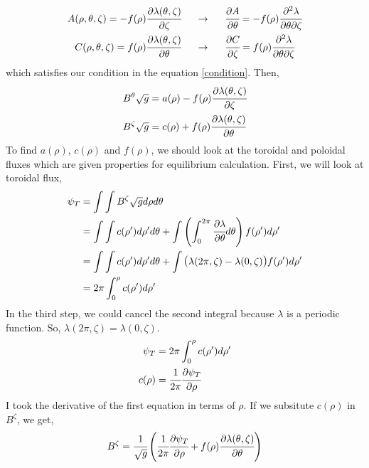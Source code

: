 \begin{align}
    A(\rho,\theta,\zeta) = -f(\rho)\cfrac{\partial\lambda(\theta,\zeta)}{\partial\zeta} \hspace{.5cm}&\rightarrow\hspace{.5cm} \cfrac{\partial A}{\partial\theta} = -f(\rho)\cfrac{\partial^2\lambda}{\partial\theta\partial\zeta} \\
    C(\rho,\theta,\zeta) = f(\rho)\cfrac{\partial\lambda(\theta,\zeta)}{\partial\theta} \hspace{.5cm}&\rightarrow\hspace{.5cm} \cfrac{\partial C}{\partial\zeta} = f(\rho)\cfrac{\partial^2\lambda}{\partial\theta\partial\zeta}    
\end{align}
which satisfies our condition in the equation \ref{condition}. Then,
\begin{align}
    B^\theta\sqrt{g} &= a(\rho) - f(\rho)\cfrac{\partial\lambda(\theta,\zeta)}{\partial\zeta} \\
    B^\zeta\sqrt{g}  &= c(\rho) + f(\rho)\cfrac{\partial\lambda(\theta,\zeta)}{\partial\theta}
\end{align}
To find $a(\rho)$,  $c(\rho)$ and $f(\rho)$, we should look at the toroidal and poloidal fluxes which are given properties for equilibrium calculation. First, we will look at toroidal flux,
\begin{align}
    \psi_{T} &= \int \int B^\zeta \jac d\rho d\theta \\
    &= \int \int c(\rho')d\rho' d\theta + \int \left(\int_0^{2\pi}\dLt d\theta\right) f(\rho')d\rho' \\
    &= \int \int c(\rho')d\rho' d\theta + \int \mathlarger{(}\lambda(2\pi,\zeta) - \lambda(0,\zeta)\mathlarger{)}f(\rho')  d\rho' \\
    &= 2\pi \int_0^\rho c(\rho')d\rho'
\end{align}
In the third step, we could cancel the second integral because $\lambda$ is a periodic function. So, $\lambda(2\pi,\zeta) = \lambda(0,\zeta)$.
\begin{align}
    \psi_{T} &= 2\pi \int_0^\rho c(\rho')d\rho' \\
    c(\rho) &= \cfrac{1}{2\pi}\cfrac{\partial \psi_{T}}{\partial \rho}
\end{align}
I took the derivative of the first equation in terms of $\rho$. If we subsitute $c(\rho)$ in $B^\zeta$, we get,
\begin{equation}
    B^\zeta = \cfrac{1}{\sqrt{g}}\left(\cfrac{1}{2\pi}\cfrac{\partial \psi_{T}}{\partial \rho} + f(\rho)\cfrac{\partial\lambda(\theta,\zeta)}{\partial\theta}\right)
\end{equation}
